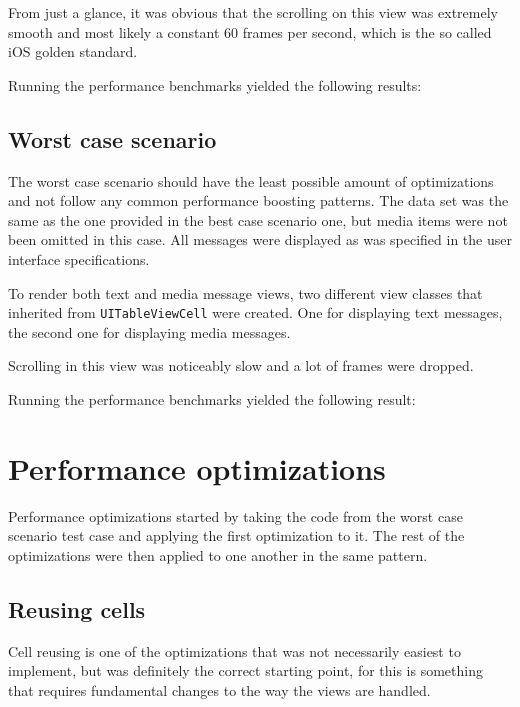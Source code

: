 \documentclass[a4paper,12pt]{article}
\begin{document}
From just a glance, it was obvious that the scrolling on this view was extremely smooth and most likely a constant 60 frames per second, which is the so called iOS golden standard.\cite{IntroducingAsyncDisplayKit}

Running the performance benchmarks yielded the following results:

\subsection{Worst case scenario}
The worst case scenario should have the least possible amount of optimizations and not follow any common performance boosting patterns. The data set was the same as the one provided in the best case scenario one, but media items were not been omitted in this case. All messages were displayed as was specified in the user interface specifications.

To render both text and media message views, two different view classes that inherited from \texttt{UITableViewCell} were created. One for displaying text messages, the second one for displaying media messages.

Scrolling in this view was noticeably slow and a lot of frames were dropped.

Running the performance benchmarks yielded the following result:

\newpage
\section{Performance optimizations}
Performance optimizations started by taking the code from the worst case scenario test case and applying the first optimization to it. The rest of the optimizations were then applied to one another in the same pattern.

\subsection{Reusing cells}
Cell reusing is one of the optimizations that was not necessarily easiest to implement, but was definitely the correct starting point, for this is something that requires fundamental changes to the way the views are handled.
\end{document}
